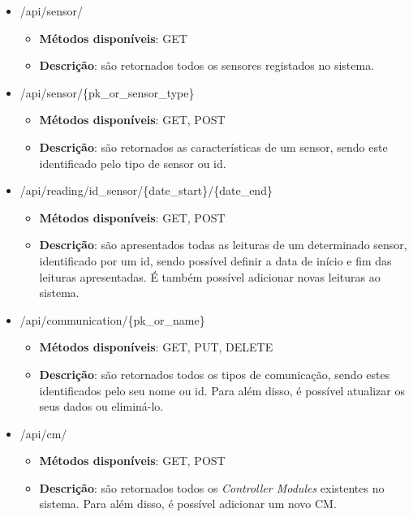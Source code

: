 \begin{itemize}
	\newpage
	
	\item /api/sensor/
	\begin{itemize}
		\item \textbf{Métodos disponíveis}: GET
		\item \textbf{Descrição}: são retornados todos os sensores registados no sistema. 
	\end{itemize}
	
	
	\item /api/sensor/\{pk\_or\_sensor\_type\}
	\begin{itemize}
		\item \textbf{Métodos disponíveis}: GET, POST
		\item \textbf{Descrição}: são retornados as características de um sensor, sendo este identificado pelo tipo de sensor ou id. 
	\end{itemize}
	
	
	\item /api/reading/{id\_sensor}/\{date\_start\}/\{date\_end\}
	\begin{itemize}
		\item \textbf{Métodos disponíveis}: GET, POST
		\item \textbf{Descrição}: são apresentados todas as leituras de um determinado sensor, identificado por um id, sendo possível definir a data de início e fim das leituras apresentadas. É também possível adicionar novas leituras ao sistema. 
	\end{itemize}
	
	
	\item /api/communication/\{pk\_or\_name\}
	\begin{itemize}
		\item \textbf{Métodos disponíveis}: GET, PUT, DELETE
		\item \textbf{Descrição}: são retornados todos os tipos de comunicação, sendo estes identificados pelo seu nome ou id. Para além disso, é possível atualizar os seus dados ou eliminá-lo. 
	\end{itemize}
	
	
	\item /api/cm/
	\begin{itemize}
		\item \textbf{Métodos disponíveis}: GET, POST
		\item \textbf{Descrição}: são retornados todos os \textit{Controller Modules} existentes no sistema. Para além disso, é possível adicionar um novo \acl{CM}. 
	\end{itemize}
	

\end{itemize}
